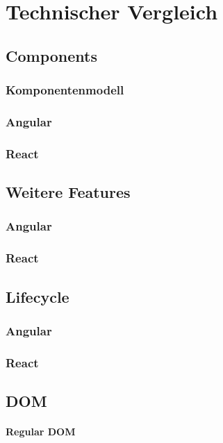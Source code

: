 \chapter{Technischer Vergleich}

\section{Components}

\subsection{Komponentenmodell}

\subsection{Angular}

\subsection{React}

\section{Weitere Features}
\subsection{Angular}
\subsection{React}

\section{Lifecycle}
\subsection{Angular}
\subsection{React}

\section{DOM}
\subsubsection{Regular DOM}
